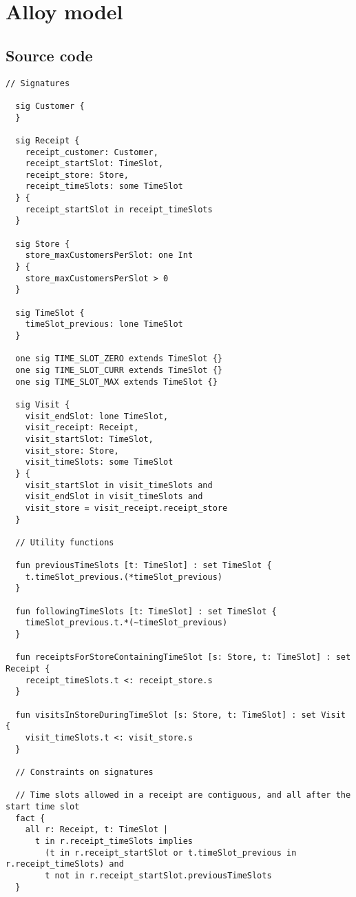 \documentclass[../../main.tex]{subfiles}
\begin{document}
\section{Alloy model}

\subsection{Source code}

\begin{lstlisting}[language=alloy]
  // Signatures

  sig Customer {
  }
  
  sig Receipt {
    receipt_customer: Customer,
    receipt_startSlot: TimeSlot,
    receipt_store: Store,
    receipt_timeSlots: some TimeSlot
  } {
    receipt_startSlot in receipt_timeSlots
  }
  
  sig Store {
    store_maxCustomersPerSlot: one Int
  } {
    store_maxCustomersPerSlot > 0
  }
  
  sig TimeSlot {
    timeSlot_previous: lone TimeSlot
  }
  
  one sig TIME_SLOT_ZERO extends TimeSlot {}
  one sig TIME_SLOT_CURR extends TimeSlot {}
  one sig TIME_SLOT_MAX extends TimeSlot {}
  
  sig Visit {
    visit_endSlot: lone TimeSlot,
    visit_receipt: Receipt,
    visit_startSlot: TimeSlot,
    visit_store: Store,
    visit_timeSlots: some TimeSlot
  } {
    visit_startSlot in visit_timeSlots and
    visit_endSlot in visit_timeSlots and
    visit_store = visit_receipt.receipt_store
  }
  
  // Utility functions
  
  fun previousTimeSlots [t: TimeSlot] : set TimeSlot {
    t.timeSlot_previous.(*timeSlot_previous)
  }
  
  fun followingTimeSlots [t: TimeSlot] : set TimeSlot {
    timeSlot_previous.t.*(~timeSlot_previous)
  }
  
  fun receiptsForStoreContainingTimeSlot [s: Store, t: TimeSlot] : set Receipt {
    receipt_timeSlots.t <: receipt_store.s
  }
  
  fun visitsInStoreDuringTimeSlot [s: Store, t: TimeSlot] : set Visit {
    visit_timeSlots.t <: visit_store.s
  }
  
  // Constraints on signatures
  
  // Time slots allowed in a receipt are contiguous, and all after the start time slot
  fact {
    all r: Receipt, t: TimeSlot |
      t in r.receipt_timeSlots implies
        (t in r.receipt_startSlot or t.timeSlot_previous in r.receipt_timeSlots) and
        t not in r.receipt_startSlot.previousTimeSlots
  }
  

\end{lstlisting}
\end{document}
